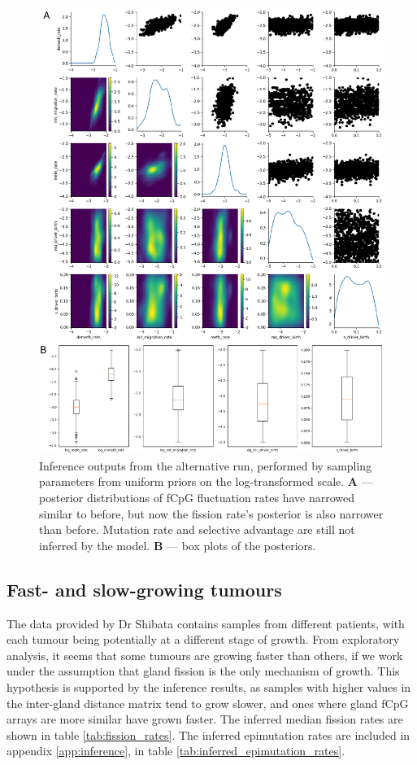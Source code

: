 \begin{figure}[h]
    \centering
    \includegraphics[width=\textwidth]{Chapter_5/figures/inference_raw/inference_S.pdf}
    \caption{Inference outputs from the alternative run, performed by sampling
    parameters from uniform priors on the log-transformed scale. \textbf{A} ---
    posterior distributions of fCpG fluctuation rates have narrowed similar to
    before, but now the fission rate's posterior is also narrower than before.
    Mutation rate and selective advantage are still not inferred by the model.
    \textbf{B} --- box plots of the posteriors.}
    \label{fig:inference_2}
\end{figure}
\clearpage

\subsection{Fast- and slow-growing tumours}
The data provided by Dr Shibata contains samples from different patients, with
each tumour being potentially at a different stage of growth. From exploratory
analysis, it seems that some tumours are growing faster than others, if we work
under the assumption that gland fission is the only mechanism of growth. This
hypothesis is supported by the inference results, as samples with higher values
in the inter-gland distance matrix tend to grow slower, and ones where gland
fCpG arrays are more similar have grown faster. The inferred median fission
rates are shown in table \ref{tab:fission_rates}. The inferred epimutation
rates are included in appendix \ref{app:inference}, in table
\ref{tab:inferred_epimutation_rates}.

